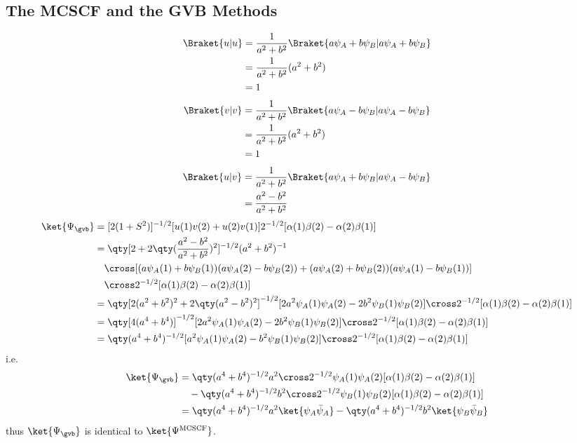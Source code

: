 \documentclass[a4paper]{article}
\begin{document}
\subsection{The MCSCF and the GVB Methods}
\begin{align}
\Braket{u|u} &= \dfrac{1}{a^2 + b^2} \Braket{a\psi_A + b\psi_B | a\psi_A + b\psi_B} \notag\\
&= \dfrac{1}{a^2 + b^2} (a^2 + b^2) \notag\\
&= 1
\end{align}
\begin{align}
\Braket{v|v} &= \dfrac{1}{a^2 + b^2} \Braket{a\psi_A - b\psi_B | a\psi_A - b\psi_B} \notag\\
&= \dfrac{1}{a^2 + b^2} (a^2 + b^2) \notag\\
&= 1
\end{align}
\begin{align}
\Braket{u|v} &= \dfrac{1}{a^2 + b^2} \Braket{a\psi_A + b\psi_B | a\psi_A - b\psi_B} \notag\\
&= \dfrac{a^2 - b^2}{a^2 + b^2} 
\end{align}
\begin{align}
\ket{\Psi_{\gvb}} &= [2(1 + S^2)]^{-1/2} [u(1)v(2) + u(2)v(1)] 2^{-1/2} [\alpha(1)\beta(2) - \alpha(2)\beta(1)] \notag\\
&= \qty[2 + 2\qty(\dfrac{a^2-b^2}{a^2+b^2})^2]^{-1/2} (a^2 + b^2)^{-1} \notag\\
&{}\quad \cross [(a\psi_A(1) + b\psi_B(1))(a\psi_A(2) - b\psi_B(2)) + (a\psi_A(2) + b\psi_B(2))(a\psi_A(1) - b\psi_B(1))] \notag\\
&{}\quad \cross 2^{-1/2} [\alpha(1)\beta(2) - \alpha(2)\beta(1)] \notag\\
&= \qty[2(a^2 + b^2)^2 + 2\qty(a^2-b^2)^2]^{-1/2} [2a^2\psi_A(1)\psi_A(2) - 2b^2\psi_B(1)\psi_B(2)] \cross 2^{-1/2} [\alpha(1)\beta(2) - \alpha(2)\beta(1)] \notag\\
&= \qty[4(a^4 + b^4)]^{-1/2} [2a^2\psi_A(1)\psi_A(2) - 2b^2\psi_B(1)\psi_B(2)] \cross 2^{-1/2} [\alpha(1)\beta(2) - \alpha(2)\beta(1)] \notag\\
&= \qty(a^4 + b^4)^{-1/2} [a^2\psi_A(1)\psi_A(2) - b^2\psi_B(1)\psi_B(2)] \cross 2^{-1/2} [\alpha(1)\beta(2) - \alpha(2)\beta(1)]
\end{align}
i.e.
\begin{align}
\ket{\Psi_{\gvb}} &= \qty(a^4 + b^4)^{-1/2}a^2 \cross 2^{-1/2} \psi_A(1)\psi_A(2)[\alpha(1)\beta(2) - \alpha(2)\beta(1)] \notag\\
&{}\quad - \qty(a^4 + b^4)^{-1/2}b^2 \cross 2^{-1/2} \psi_B(1)\psi_B(2)[\alpha(1)\beta(2) - \alpha(2)\beta(1)]  \notag\\
&= \qty(a^4 + b^4)^{-1/2}a^2 \ket{\psi_A\bar\psi_A} - \qty(a^4 + b^4)^{-1/2}b^2 \ket{\psi_B\bar\psi_B}
\end{align}
thus $ \ket{\Psi_{\gvb}} $ is identical to $ \ket{\Psi^{\text{MCSCF}}} $.
\end{document}
